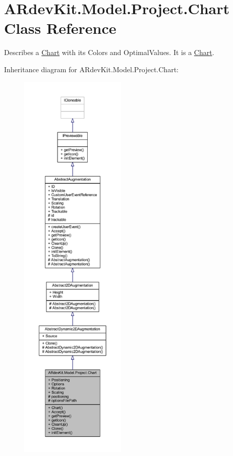 \hypertarget{class_a_rdev_kit_1_1_model_1_1_project_1_1_chart}{\section{A\-Rdev\-Kit.\-Model.\-Project.\-Chart Class Reference}
\label{class_a_rdev_kit_1_1_model_1_1_project_1_1_chart}
}


Describes a \hyperlink{class_a_rdev_kit_1_1_model_1_1_project_1_1_chart}{Chart} with its Colors and Optimal\-Values. It is a \hyperlink{class_a_rdev_kit_1_1_model_1_1_project_1_1_chart}{Chart}.  




Inheritance diagram for A\-Rdev\-Kit.\-Model.\-Project.\-Chart\-:
\nopagebreak
\begin{figure}[H]
\begin{center}
\leavevmode
\includegraphics[height=550pt]{class_a_rdev_kit_1_1_model_1_1_project_1_1_chart__inherit__graph}
\end{center}
\end{figure}


